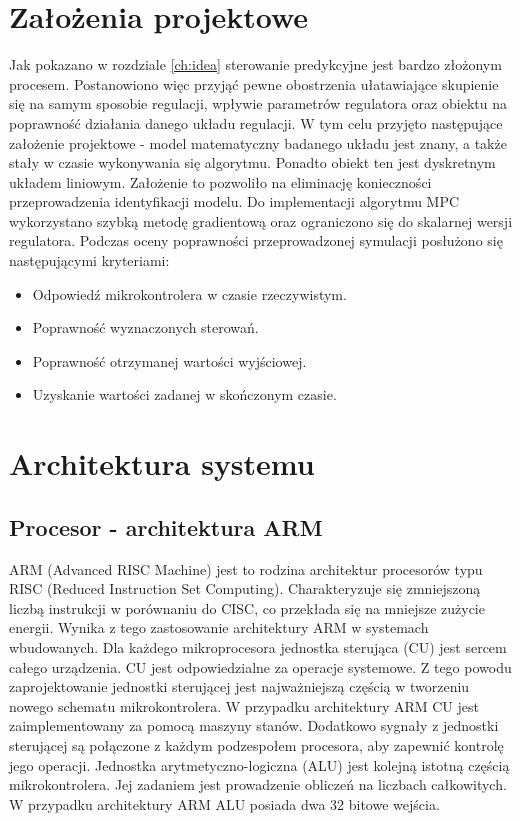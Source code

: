 \section{Założenia projektowe} \label{sec:assumptions}
Jak pokazano w rozdziale \ref{ch:idea} sterowanie predykcyjne jest bardzo złożonym procesem.
Postanowiono więc przyjąć pewne obostrzenia ułatawiające skupienie się na samym sposobie regulacji, 
wpływie parametrów regulatora oraz obiektu na poprawność działania danego układu regulacji. W tym
celu przyjęto następujące założenie projektowe - model matematyczny badanego układu jest znany, a
także stały w czasie wykonywania się algorytmu. Ponadto obiekt ten jest dyskretnym układem liniowym.
Założenie to pozwoliło na eliminację konieczności przeprowadzenia identyfikacji modelu. Do
implementacji algorytmu MPC wykorzystano szybką metodę gradientową oraz ograniczono się do skalarnej
wersji regulatora.
Podczas oceny poprawności przeprowadzonej symulacji posłużono się następującymi kryteriami:  
\begin{itemize}
	\item Odpowiedź mikrokontrolera w czasie rzeczywistym.
    \item Poprawność wyznaczonych sterowań.
    \item Poprawność otrzymanej wartości wyjściowej.
    \item Uzyskanie wartości zadanej w skończonym czasie.
\end{itemize}

\section{Architektura systemu} \label{sec:system}

\subsection{Procesor - architektura ARM} \label{sec:arm}
ARM (Advanced RISC Machine) jest to rodzina architektur procesorów typu RISC (Reduced Instruction
Set Computing). Charakteryzuje się zmniejszoną liczbą instrukcji w porównaniu do CISC, co
przekłada się na mniejsze zużycie energii. Wynika z tego zastosowanie architektury ARM
w systemach wbudowanych. Dla każdego mikroprocesora jednostka sterująca (CU) jest sercem całego
urządzenia. CU jest odpowiedzialne za operacje systemowe. Z tego powodu zaprojektowanie jednostki
sterującej jest najważniejszą częścią w tworzeniu nowego schematu mikrokontrolera. W przypadku
architektury ARM CU jest zaimplementowany za pomocą maszyny stanów. Dodatkowo sygnały z jednostki
sterującej są połączone z każdym podzespołem procesora, aby zapewnić kontrolę jego operacji.
Jednostka arytmetyczno-logiczna (ALU) jest kolejną istotną częścią mikrokontrolera. Jej zadaniem
jest prowadzenie obliczeń na liczbach całkowitych. W przypadku architektury ARM ALU posiada dwa
32 bitowe wejścia.  

